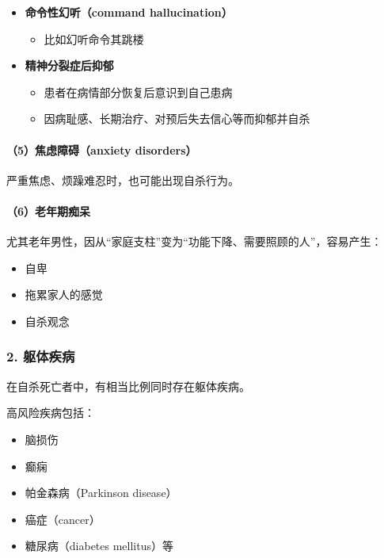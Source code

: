 \documentclass[
  chinese,
  9pt,
  a4paper,
]{ctexart}
\providecommand{\tightlist}{%
  \setlength{\itemsep}{0pt}\setlength{\parskip}{0pt}}
\begin{document}
\begin{itemize}
\item
  \textbf{命令性幻听（command hallucination）}

  \begin{itemize}
  \tightlist
  \item
    比如幻听命令其跳楼
  \end{itemize}
\item
  \textbf{精神分裂症后抑郁}

  \begin{itemize}
  \tightlist
  \item
    患者在病情部分恢复后意识到自己患病
  \item
    因病耻感、长期治疗、对预后失去信心等而抑郁并自杀
  \end{itemize}
\end{itemize}

\paragraph{（5）焦虑障碍（anxiety
disorders）}\label{ux7126ux8651ux969cux788danxiety-disorders}

严重焦虑、烦躁难忍时，也可能出现自杀行为。

\paragraph{（6）老年期痴呆}\label{ux8001ux5e74ux671fux75f4ux5446}

尤其老年男性，因从``家庭支柱''变为``功能下降、需要照顾的人''，容易产生：

\begin{itemize}
\tightlist
\item
  自卑
\item
  拖累家人的感觉
\item
  自杀观念
\end{itemize}

\subsubsection{2. 躯体疾病}\label{ux8eafux4f53ux75beux75c5}

在自杀死亡者中，有相当比例同时存在躯体疾病。

高风险疾病包括：

\begin{itemize}
\tightlist
\item
  脑损伤
\item
  癫痫
\item
  帕金森病（Parkinson disease）
\item
  癌症（cancer）
\item
  糖尿病（diabetes mellitus）等
\end{itemize}
\end{document}
